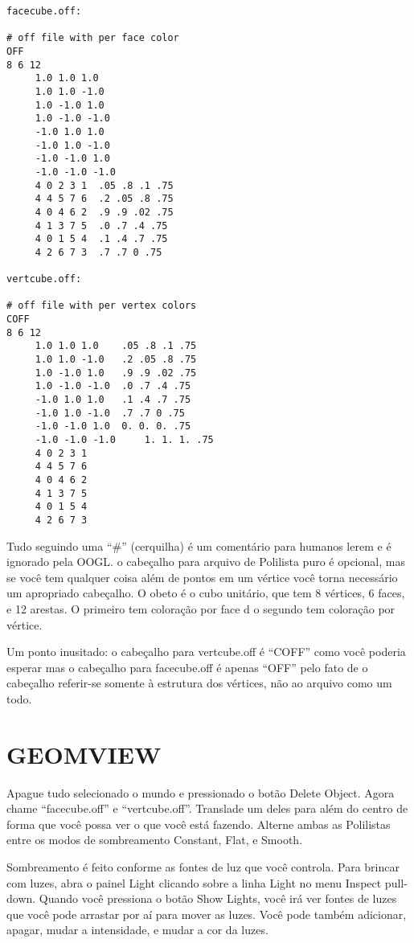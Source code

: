 \documentclass[12pt,a4paper]{book}
\begin{document}
\begin{verbatim}
facecube.off:

# off file with per face color
OFF
8 6 12
     1.0 1.0 1.0 
     1.0 1.0 -1.0 
     1.0 -1.0 1.0 
     1.0 -1.0 -1.0 
     -1.0 1.0 1.0 
     -1.0 1.0 -1.0 
     -1.0 -1.0 1.0 
     -1.0 -1.0 -1.0 
     4 0 2 3 1  .05 .8 .1 .75
     4 4 5 7 6  .2 .05 .8 .75
     4 0 4 6 2  .9 .9 .02 .75
     4 1 3 7 5  .0 .7 .4 .75
     4 0 1 5 4  .1 .4 .7 .75
     4 2 6 7 3  .7 .7 0 .75

vertcube.off:

# off file with per vertex colors
COFF
8 6 12
     1.0 1.0 1.0 	.05 .8 .1 .75
     1.0 1.0 -1.0	.2 .05 .8 .75 
     1.0 -1.0 1.0	.9 .9 .02 .75 
     1.0 -1.0 -1.0 	.0 .7 .4 .75
     -1.0 1.0 1.0 	.1 .4 .7 .75
     -1.0 1.0 -1.0 	.7 .7 0 .75
     -1.0 -1.0 1.0 	0. 0. 0. .75
     -1.0 -1.0 -1.0 	1. 1. 1. .75	
     4 0 2 3 1  
     4 4 5 7 6  
     4 0 4 6 2  
     4 1 3 7 5  
     4 0 1 5 4  
     4 2 6 7 3  
\end{verbatim}

Tudo seguindo uma ``#'' (cerquilha) é um comentário para humanos lerem e é
ignorado pela OOGL. o cabeçalho para arquivo de Polilista puro é opcional, mas
se você tem qualquer coisa além de pontos em um vértice você torna necessário um apropriado
cabeçalho.  O obeto é o cubo unitário, que tem 8 vértices, 6 faces,
e 12 arestas.  O primeiro tem coloração por face d o segundo tem
coloração por vértice.

Um ponto inusitado: o cabeçalho para vertcube.off é ``COFF'' como você poderia
esperar mas o cabeçalho para facecube.off é apenas ``OFF'' pelo fato de o
cabeçalho referir-se somente à estrutura dos vértices, não ao arquivo
como um todo.

\section{GEOMVIEW}
Apague tudo selecionado o mundo e pressionado o botão Delete
Object. Agora chame ``facecube.off'' e ``vertcube.off''. Translade um
deles para além do centro de forma que você possa ver o que você está fazendo.
Alterne ambas as Polilistas entre os modos de sombreamento Constant, Flat, e
Smooth.

Sombreamento é feito conforme as fontes de luz que você controla.
Para brincar com luzes, abra o painel Light clicando sobre a linha
Light no menu Inspect pull-down. Quando você pressiona o botão Show Lights,
você irá ver fontes de luzes que você pode arrastar por aí para mover as luzes.
Você pode também adicionar, apagar, mudar a intensidade, e mudar a
cor da luzes.
\end{document}
